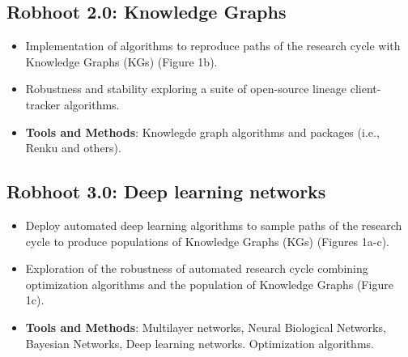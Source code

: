 \documentclass[10pt, a4paper, twocolumn]{article} %
\begin{document}
{  \subsection{Robhoot 2.0: Knowledge Graphs}
  \begin{itemize}
  \item Implementation of algorithms to reproduce paths of the
    research cycle with Knowledge Graphs (KGs) (Figure 1b).
  \item Robustness and stability exploring a suite of open-source
    lineage client-tracker algorithms.
  \end{itemize}

   \begin{itemize}
   \item {\bf Tools and Methods}: Knowlegde graph algorithms and
     packages (i.e., Renku and others).
 \end{itemize}
  \vspace{-0.15 in}
  
  \subsection{Robhoot 3.0: Deep learning networks}
  \begin{itemize}
  \item Deploy automated deep learning algorithms to sample paths of
    the research cycle to produce populations of Knowledge Graphs
    (KGs) (Figures 1a-c).
  \item Exploration of the robustness of automated research cycle combining
    optimization algorithms and the population of Knowledge Graphs
    (Figure 1c).
  \end{itemize}

 \begin{itemize}
 \item {\bf Tools and Methods}: Multilayer networks, Neural Biological
   Networks, Bayesian Networks, Deep learning networks. Optimization
   algorithms.
 \end{itemize}
  
  \vspace{-0.15 in}
  
}
\end{document}
